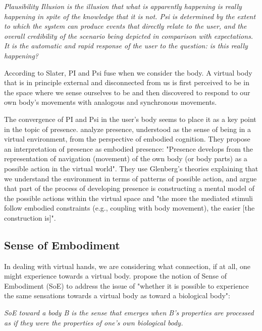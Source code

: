 \begin{displayquote}
\textit{Plausibility Illusion is the illusion that what is apparently happening is really happening in spite of the knowledge that it is not. Psi is determined by the extent to which the system can produce events that directly relate to the user, and the overall credibility of the scenario being depicted in comparison with expectations. It is the automatic and rapid response of the user to the question: is this really happening?}
\end{displayquote}

According to Slater, PI and Psi fuse when we consider the body. A virtual body that is in principle external and disconnected from us is first perceived to be in the space where we sense ourselves to be and then discovered to respond to our own body's movements with analogous and synchronous movements.

The convergence of PI and Psi in the user's body seems to place it as a key point in the topic of presence. \parencite{Schubert1999} analyze presence, understood as the sense of being in a virtual environment, from the perspective of embodied cognition. They propose an interpretation of presence as embodied presence: "Presence develops from the representation of navigation (movement) of the own body (or body parts) as a possible action in the virtual world". They use Glenberg's theories explaining that we understand the environment in terms of patterns of possible action, and argue that part of the process of developing presence is constructing a mental model of the possible actions within the virtual space and "the more the mediated stimuli follow embodied constraints (e.g., coupling with body movement), the easier [the construction is]".

\subsection{Sense of Embodiment}
\label{subsec:embodiment}

In dealing with virtual hands, we are considering what connection, if at all, one might experience towards a virtual body. \parencite{Kilteni2012} propose the notion of Sense of Embodiment (SoE) to address the issue of "whether it is possible to experience the same sensations towards a virtual body as toward a biological body":

\begin{displayquote}
\textit{SoE toward a body B is the sense that emerges when B's properties are processed as if they were the properties of one's own biological body.}
\end{displayquote}

